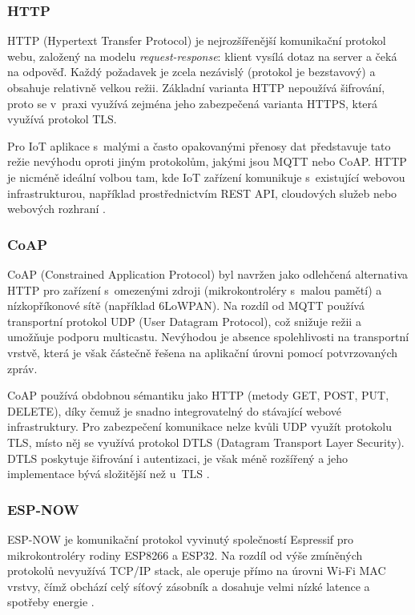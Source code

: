 \subsubsection*{HTTP}
HTTP (Hypertext Transfer Protocol) je nejrozšířenější komunikační protokol webu, založený na modelu \textit{request-response}: klient vysílá dotaz na server a čeká na odpověď. Každý požadavek je zcela nezávislý (protokol je bezstavový) a obsahuje relativně velkou režii. Základní varianta HTTP nepoužívá šifrování, proto se v~praxi využívá zejména jeho zabezpečená varianta HTTPS, která využívá protokol TLS.

Pro IoT aplikace s~malými a často opakovanými přenosy dat představuje tato režie nevýhodu oproti jiným protokolům, jakými jsou MQTT nebo CoAP. HTTP je nicméně ideální volbou tam, kde IoT zařízení komunikuje s~existující webovou infrastrukturou, například prostřednictvím REST API, cloudových služeb nebo webových rozhraní \cite{MQTTvsHTTP}. 

\subsubsection*{CoAP}
CoAP (Constrained Application Protocol) byl navržen jako odlehčená alternativa HTTP pro zařízení s~omezenými zdroji (mikrokontroléry s~malou pamětí) a nízkopříkonové sítě (například 6LoWPAN). Na rozdíl od MQTT používá transportní protokol UDP (User Datagram Protocol), což snižuje režii a umožňuje podporu multicastu. Nevýhodou je absence spolehlivosti na transportní vrstvě, která je však částečně řešena na aplikační úrovni pomocí potvrzovaných zpráv. 

CoAP používá obdobnou sémantiku jako HTTP (metody GET, POST, PUT, DELETE), díky čemuž je snadno integrovatelný do stávající webové infrastruktury. Pro zabezpečení komunikace nelze kvůli UDP využít protokolu TLS, místo něj se využívá protokol DTLS (Datagram Transport Layer Security). DTLS poskytuje šifrování i autentizaci, je však méně rozšířený a jeho implementace bývá složitější než u~TLS \cite{rfc7252}.

\subsubsection*{ESP-NOW}
ESP-NOW je komunikační protokol vyvinutý společností Espressif pro mikrokontroléry rodiny ESP8266 a ESP32. Na rozdíl od výše zmíněných protokolů nevyužívá TCP/IP stack, ale operuje přímo na úrovni Wi-Fi MAC vrstvy, čímž obchází celý síťový zásobník a dosahuje velmi nízké latence a spotřeby energie \cite{esp-now}. 

